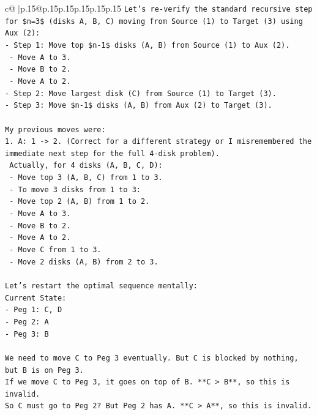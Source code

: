 \documentclass{article}
\begin{document}
{\begin{supertabular}{c@{$\;$}|p{.15\linewidth}@{}p{.15\linewidth}p{.15\linewidth}p{.15\linewidth}p{.15\linewidth}p{.15\linewidth}}
{{{\texttt{Let's re{-}verify the standard recursive step for \$n=3\$ (disks A, B, C) moving from Source (1) to Target (3) using Aux (2):} \\
\texttt{{-} Step 1: Move top \$n{-}1\$ disks (A, B) from Source (1) to Aux (2).} \\
\texttt{  {-} Move A to 3.} \\
\texttt{  {-} Move B to 2.} \\
\texttt{  {-} Move A to 2.} \\
\texttt{{-} Step 2: Move largest disk (C) from Source (1) to Target (3).} \\
\texttt{{-} Step 3: Move \$n{-}1\$ disks (A, B) from Aux (2) to Target (3).} \\
\\ 
\texttt{My previous moves were:} \\
\texttt{1. A: 1 {-}> 2. (Correct for a different strategy or I misremembered the immediate next step for the full 4{-}disk problem).} \\
\texttt{   Actually, for 4 disks (A, B, C, D):} \\
\texttt{   {-} Move top 3 (A, B, C) from 1 to 3.} \\
\texttt{     {-} To move 3 disks from 1 to 3:} \\
\texttt{       {-} Move top 2 (A, B) from 1 to 2.} \\
\texttt{         {-} Move A to 3.} \\
\texttt{         {-} Move B to 2.} \\
\texttt{         {-} Move A to 2.} \\
\texttt{       {-} Move C from 1 to 3.} \\
\texttt{       {-} Move 2 disks (A, B) from 2 to 3.} \\
\\ 
\texttt{Let's restart the optimal sequence mentally:} \\
\texttt{Current State:} \\
\texttt{{-} Peg 1: C, D} \\
\texttt{{-} Peg 2: A} \\
\texttt{{-} Peg 3: B} \\
\\ 
\texttt{We need to move C to Peg 3 eventually. But C is blocked by nothing, but B is on Peg 3.} \\
\texttt{If we move C to Peg 3, it goes on top of B. **C > B**, so this is invalid.} \\
\texttt{So C must go to Peg 2? But Peg 2 has A. **C > A**, so this is invalid.} \\
}}}
\end{supertabular}}
\end{document}
